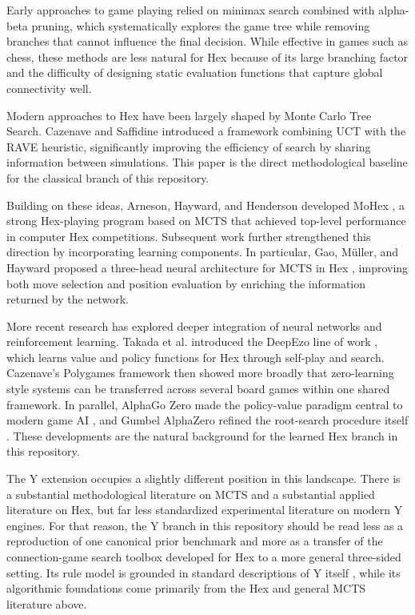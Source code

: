 \documentclass[11pt,a4paper]{article}
\begin{document}
Early approaches to game playing relied on minimax search combined with
alpha-beta pruning, which systematically explores the game tree while removing
branches that cannot influence the final decision. While effective in games
such as chess, these methods are less natural for Hex because of its large
branching factor and the difficulty of designing static evaluation functions
that capture global connectivity well.

Modern approaches to Hex have been largely shaped by Monte Carlo Tree Search.
Cazenave and Saffidine \cite{cazenave2010montecarlohex} introduced a framework
combining UCT with the RAVE heuristic, significantly improving the efficiency
of search by sharing information between simulations. This paper is the direct
methodological baseline for the classical branch of this repository.

Building on these ideas, Arneson, Hayward, and Henderson developed MoHex
\cite{arneson2010mctshex}, a strong Hex-playing program based on MCTS that
achieved top-level performance in computer Hex competitions. Subsequent work
further strengthened this direction by incorporating learning components. In
particular, Gao, M\"uller, and Hayward proposed a three-head neural
architecture for MCTS in Hex \cite{gao2018threehead}, improving both move
selection and position evaluation by enriching the information returned by the
network.

More recent research has explored deeper integration of neural networks and
reinforcement learning. Takada et al. introduced the DeepEzo line of work
\cite{takada2020reinforcement}, which learns value and policy functions for Hex
through self-play and search. Cazenave's Polygames framework
\cite{cazenave2020polygames} then showed more broadly that zero-learning style
systems can be transferred across several board games within one shared
framework. In parallel, AlphaGo Zero made the policy-value paradigm central to
modern game AI \cite{silver2017mastering}, and Gumbel AlphaZero refined the
root-search procedure itself \cite{danihelka2022gumbel}. These developments are
the natural background for the learned Hex branch in this repository.

The Y extension occupies a slightly different position in this landscape. There
is a substantial methodological literature on MCTS and a substantial applied
literature on Hex, but far less standardized experimental literature on modern
Y engines. For that reason, the Y branch in this repository should be read less
as a reproduction of one canonical prior benchmark and more as a transfer of
the connection-game search toolbox developed for Hex to a more general
three-sided setting. Its rule model is grounded in standard descriptions of Y
itself \cite{boardspace_y,gambiter_y}, while its algorithmic foundations come
primarily from the Hex and general MCTS literature above.
\end{document}
